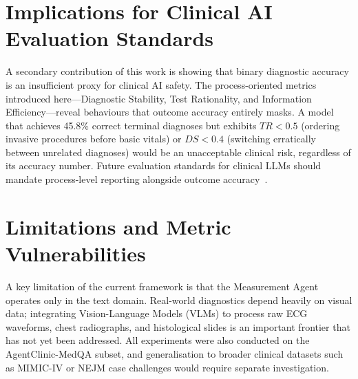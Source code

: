 \section{Implications for Clinical AI Evaluation Standards}

A secondary contribution of this work is showing that binary diagnostic accuracy is an insufficient proxy for clinical AI safety. The process-oriented metrics introduced here---Diagnostic Stability, Test Rationality, and Information Efficiency---reveal behaviours that outcome accuracy entirely masks. A model that achieves 45.8\% correct terminal diagnoses but exhibits $TR < 0.5$ (ordering invasive procedures before basic vitals) or $DS < 0.4$ (switching erratically between unrelated diagnoses) would be an unacceptable clinical risk, regardless of its accuracy number. Future evaluation standards for clinical LLMs should mandate process-level reporting alongside outcome accuracy~\cite{johri2023guidelines}.

\section{Limitations and Metric Vulnerabilities}

A key limitation of the current framework is that the Measurement Agent operates only in the text domain. Real-world diagnostics depend heavily on visual data; integrating Vision-Language Models (VLMs) to process raw ECG waveforms, chest radiographs, and histological slides is an important frontier that has not yet been addressed. All experiments were also conducted on the AgentClinic-MedQA subset, and generalisation to broader clinical datasets such as MIMIC-IV or NEJM case challenges would require separate investigation.

